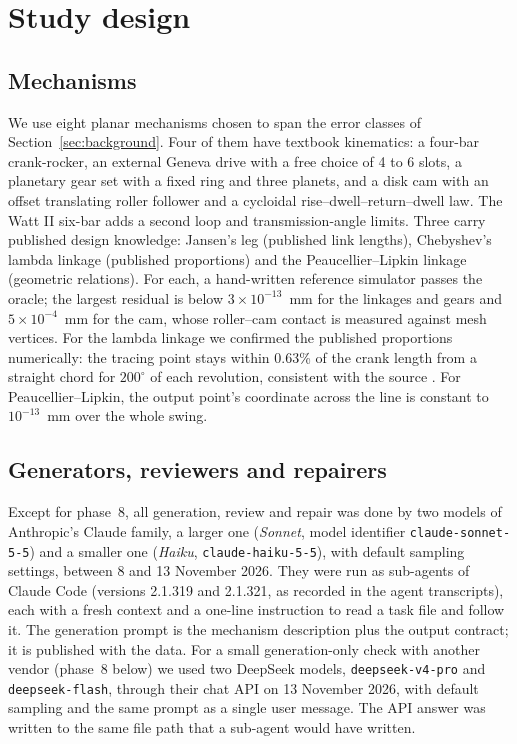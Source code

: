 \section{Study design}\label{sec:design}

\subsection{Mechanisms}
We use eight planar mechanisms chosen to span the error classes of Section~\ref{sec:background}. Four of them have textbook kinematics: a four-bar crank-rocker, an external Geneva drive with a free choice of 4 to 6 slots, a planetary gear set with a fixed ring and three planets, and a disk cam with an offset translating roller follower and a cycloidal rise--dwell--return--dwell law. The Watt II six-bar adds a second loop and transmission-angle limits. Three carry published design knowledge: Jansen's leg (published link lengths), Chebyshev's lambda linkage (published proportions) and the Peaucellier--Lipkin linkage (geometric relations). For each, a hand-written reference simulator passes the oracle; the largest residual is below $3\times10^{-13}$~mm for the linkages and gears and $5\times10^{-4}$~mm for the cam, whose roller--cam contact is measured against mesh vertices. For the lambda linkage we confirmed the published proportions numerically: the tracing point stays within 0.63\% of the crank length from a straight chord for $200^\circ$ of each revolution, consistent with the source \citep{wiki_lambda}. For Peaucellier--Lipkin, the output point's coordinate across the line is constant to $10^{-13}$~mm over the whole swing.

\subsection{Generators, reviewers and repairers}
Except for phase~8, all generation, review and repair was done by two models of Anthropic's Claude family, a larger one (\emph{Sonnet}, model identifier \texttt{claude-sonnet-5-5}) and a smaller one (\emph{Haiku}, \texttt{claude-haiku-5-5}), with default sampling settings, between 8 and 13 November 2026. They were run as sub-agents of Claude Code (versions 2.1.319 and 2.1.321, as recorded in the agent transcripts), each with a fresh context and a one-line instruction to read a task file and follow it. The generation prompt is the mechanism description plus the output contract; it is published with the data. For a small generation-only check with another vendor (phase~8 below) we used two DeepSeek models, \texttt{deepseek-v4-pro} and \texttt{deepseek-flash}, through their chat API on 13 November 2026, with default sampling and the same prompt as a single user message. The API answer was written to the same file path that a sub-agent would have written.


